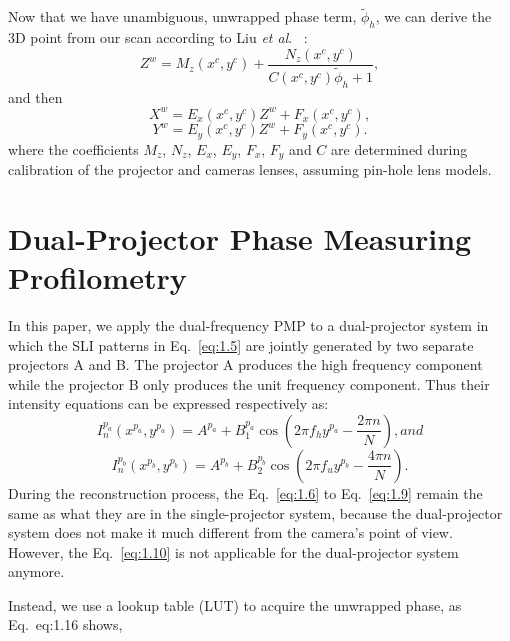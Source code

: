 \documentclass[]{spie}  %
\begin{document}
Now that we have unambiguous, unwrapped phase term, $\tilde{\phi}_h$, we can derive the 3D point from our scan according to Liu \textit{et al}. ~\cite{liuk10}:
\begin{equation}\label{eq:1.11}
	Z^w = M_z(x^c, y^c) + \frac{N_z(x^c, y^c)}{C(x^c, y^c) \tilde{\phi}_h + 1},
\end{equation}
and then
\begin{equation}\label{eq:1.12}
	X^w = E_x(x^c, y^c)Z^w + F_x(x^c, y^c),
\end{equation}
\begin{equation}\label{eq:1.13}
	Y^w = E_y(x^c, y^c)Z^w + F_y(x^c, y^c).
\end{equation}
where the coefficients $M_z$, $N_z$, $E_x$, $E_y$, $F_x$, $F_y$ and $C$ are determined during calibration of the projector and cameras lenses, assuming pin-hole lens models.


\section{Dual-Projector Phase Measuring Profilometry}
In this paper, we apply the dual-frequency PMP to a dual-projector system in which the SLI patterns in Eq.~\eqref{eq:1.5} are jointly generated by two separate projectors A and B. The projector A produces the high frequency component while the projector B only produces the unit frequency component. Thus their intensity equations can be expressed respectively as:
   \begin{equation} \label{eq:1.14}
  	I^{p_a}_n(x^{p_a}, y^{p_a}) = A^{p_a} + B^{p_a}_1\cos\left(2\pi f_h y^{p_a} - \frac{2\pi n}{N}\right), and 
  \end{equation}
   \begin{equation} \label{eq:1.15}
  	I^{p_b}_n(x^{p_b}, y^{p_b}) = A^{p_b} + B^{p_b}_2\cos\left(2\pi f_u y^{p_b} - \frac{4\pi n}{N}\right).
  \end{equation}
During the reconstruction process, the Eq.~\eqref{eq:1.6} to Eq.~\eqref{eq:1.9} remain the same as what they are in the single-projector system, because the dual-projector system does not make it much different from the camera's point of view. However, the Eq.~\eqref{eq:1.10} is not applicable for the dual-projector system anymore. 

Instead, we use a lookup table (LUT) to acquire the unwrapped phase, as Eq.~{eq:1.16} shows,
\end{document}
